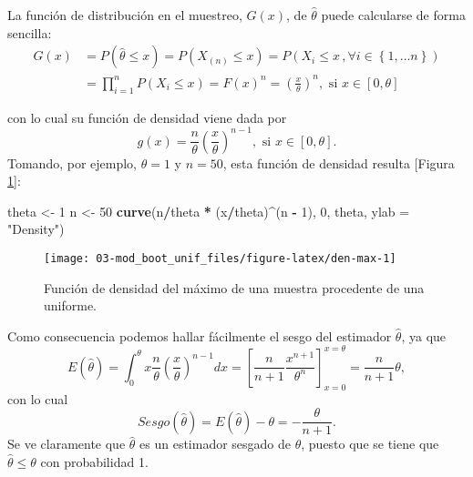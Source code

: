 \documentclass[
]{book}
\newenvironment{Shaded}{\begin{snugshade}}{\end{snugshade}}
\newcommand{\DataTypeTok}[1]{\textcolor[rgb]{0.13,0.29,0.53}{#1}}
\newcommand{\DecValTok}[1]{\textcolor[rgb]{0.00,0.00,0.81}{#1}}
\newcommand{\KeywordTok}[1]{\textcolor[rgb]{0.13,0.29,0.53}{\textbf{#1}}}
\newcommand{\NormalTok}[1]{#1}
\newcommand{\OperatorTok}[1]{\textcolor[rgb]{0.81,0.36,0.00}{\textbf{#1}}}
\newcommand{\StringTok}[1]{\textcolor[rgb]{0.31,0.60,0.02}{#1}}
\theoremstyle{break}
\theoremstyle{definition}
\theoremstyle{definition}
\theoremstyle{definition}
\theoremstyle{remark}
\begin{document}
La función de distribución en el muestreo, \(G\left( x \right)\), de
\(\hat{\theta}\) puede calcularse de forma sencilla:\[\begin{aligned}
G\left( x \right) &= P\left( \hat{\theta}\leq x \right) =P\left( X_{\left(
n \right)}\leq x \right) =P\left( X_i\leq x\,,\forall i\in \left\{ 1,\ldots
n\right\} \right) \\
&= \prod_{i=1}^{n}P\left( X_i\leq x \right) =F\left( x \right)^{n}=\left( 
\frac{x}{\theta } \right)^{n},\text{ si }x\in \left[ 0,\theta \right]\end{aligned}\]

con lo cual su función de densidad viene dada por
\[g\left( x \right) =\frac{n}{\theta }\left( \frac{x}{\theta } \right)^{n-1},
\text{ si }x\in \left[ 0,\theta \right] .\]
Tomando, por ejemplo, \(\theta =1\) y \(n=50\), esta función de densidad resulta
{[}Figura \ref{fig:den-max}{]}:

\begin{Shaded}
\begin{Highlighting}[]
\NormalTok{theta <-}\StringTok{ }\DecValTok{1}
\NormalTok{n <-}\StringTok{ }\DecValTok{50}
\KeywordTok{curve}\NormalTok{(n}\OperatorTok{/}\NormalTok{theta }\OperatorTok{*}\StringTok{ }\NormalTok{(x}\OperatorTok{/}\NormalTok{theta)}\OperatorTok{^}\NormalTok{(n }\OperatorTok{-}\StringTok{ }\DecValTok{1}\NormalTok{), }\DecValTok{0}\NormalTok{, theta, }\DataTypeTok{ylab =} \StringTok{"Density"}\NormalTok{)}
\end{Highlighting}
\end{Shaded}

\begin{figure}[!htb]

{\centering \texttt{[image: 03-mod\_boot\_unif\_files/figure-latex/den-max-1]} 

}

\caption{Función de densidad del máximo de una muestra procedente de una uniforme.}\label{fig:den-max}
\end{figure}

Como consecuencia podemos hallar fácilmente el sesgo del estimador
\(\hat{\theta}\), ya que
\[E\left( \hat{\theta} \right) =\int_{0}^{\theta }x\frac{n}{\theta }\left( 
\frac{x}{\theta } \right)^{n-1}dx=\left[ \frac{n}{n+1}\frac{x^{n+1}}{\theta
^{n}}\right] _{x=0}^{x=\theta }=\frac{n}{n+1}\theta ,\]
con lo cual
\[Sesgo\left( \hat{\theta} \right) =E\left( \hat{\theta} \right)
-\theta = -\frac{\theta }{n+1}.\]
Se ve claramente que \(\hat{\theta}\)
es un estimador sesgado de \(\theta\), puesto que se tiene que
\(\hat{\theta}\leq \theta\) con probabilidad 1.
\end{document}
